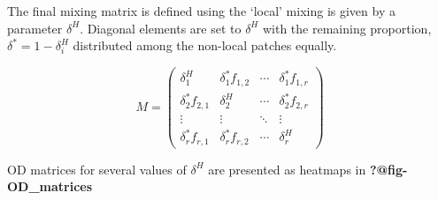 \documentclass[
  letterpaper,
  DIV=11,
  numbers=noendperiod]{scrartcl}
\begin{document}
The final mixing matrix is defined using the `local' mixing is given by
a parameter \(\delta^H\). Diagonal elements are set to \(\delta^H\) with
the remaining proportion, \(\delta^* = 1-\delta^H_i\) distributed among
the non-local patches equally.

\[
M=\left(\begin{array}{cccc}
\delta_{1}^{H} & \delta_{1}^{*} f_{1,2} & \cdots & \delta_{1}^{*} f_{1, r} \\
\delta_{2}^{*} f_{2,1} & \delta_{2}^{H} & \cdots & \delta_{2}^{*} f_{2, r} \\
\vdots & \vdots & \ddots & \vdots \\
\delta_{r}^{*} f_{r, 1} & \delta_{r}^{*} f_{r, 2} & \cdots & \delta_{r}^{H}
\end{array}\right)
\]

OD matrices for several values of \(\delta^H\) are presented as heatmaps
in \textbf{?@fig-OD\_matrices}
\end{document}
